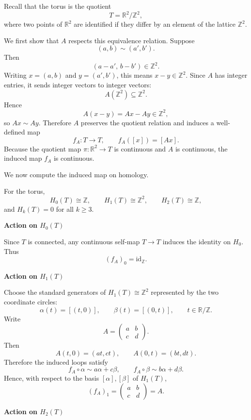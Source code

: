 \begin{solution}
Recall that the torus is the quotient
\[
T=\mathbb R^2/\mathbb Z^2,
\]
where two points of \(\mathbb R^2\) are identified if they differ by an element of the lattice \(\mathbb Z^2\).

We first show that \(A\) respects this equivalence relation. Suppose
\[
(a,b)\sim (a',b').
\]
Then
\[
(a-a',\,b-b')\in \mathbb Z^2.
\]
Writing \(x=(a,b)\) and \(y=(a',b')\), this means \(x-y\in \mathbb Z^2\). Since \(A\) has integer entries, it sends integer vectors to integer vectors:
\[
A(\mathbb Z^2)\subseteq \mathbb Z^2.
\]
Hence
\[
A(x-y)=Ax-Ay\in \mathbb Z^2,
\]
so \(Ax\sim Ay\). Therefore \(A\) preserves the quotient relation and induces a well-defined map
\[
f_A:T\to T,
\qquad
f_A([x])=[Ax].
\]
Because the quotient map \(\pi:\mathbb R^2\to T\) is continuous and \(A\) is continuous, the induced map \(f_A\) is continuous.

We now compute the induced map on homology.

For the torus,
\[
H_0(T)\cong \mathbb Z,\qquad
H_1(T)\cong \mathbb Z^2,\qquad
H_2(T)\cong \mathbb Z,
\]
and \(H_k(T)=0\) for all \(k\ge 3\).


\medskip
\noindent\textbf{Action on \(H_0(T)\)}\par
\smallskip

Since \(T\) is connected, any continuous self-map \(T\to T\) induces the identity on \(H_0\). Thus
\[
(f_A)_0=\mathrm{id}_{\mathbb Z}.
\]


\medskip
\noindent\textbf{Action on \(H_1(T)\)}\par
\smallskip

Choose the standard generators of \(H_1(T)\cong \mathbb Z^2\) represented by the two coordinate circles:
\[
\alpha(t)=[(t,0)],
\qquad
\beta(t)=[(0,t)],
\qquad t\in \mathbb R/\mathbb Z.
\]
Write
\[
A=
\begin{pmatrix}
	a & b\\
	c & d
\end{pmatrix}.
\]
Then
\[
A(t,0)=(at,ct),
\qquad
A(0,t)=(bt,dt).
\]
Therefore the induced loops satisfy
\[
f_A\circ \alpha \sim a\alpha+c\beta,
\qquad
f_A\circ \beta \sim b\alpha+d\beta.
\]
Hence, with respect to the basis \([\alpha],[\beta]\) of \(H_1(T)\),
\[
(f_A)_1=
\begin{pmatrix}
	a & b\\
	c & d
\end{pmatrix}
=A.
\]


\medskip
\noindent\textbf{Action on \(H_2(T)\)}\par
\smallskip


\end{solution}
